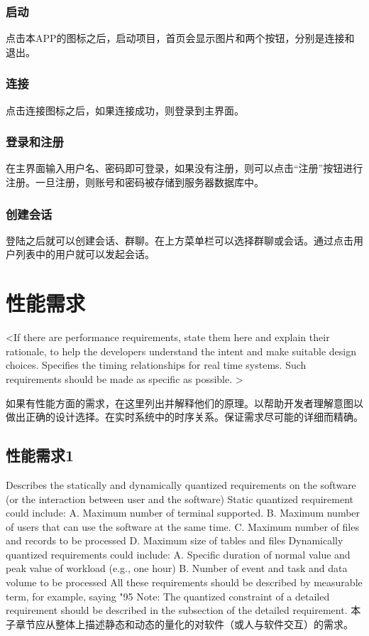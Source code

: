 \subsubsection{启动}
  点击本APP的图标之后，启动项目，首页会显示图片和两个按钮，分别是连接和退出。
\subsubsection{连接}
  点击连接图标之后，如果连接成功，则登录到主界面。
\subsubsection{登录和注册}
  在主界面输入用户名、密码即可登录，如果没有注册，则可以点击“注册”按钮进行注册。一旦注册，则账号和密码被存储到服务器数据库中。
\subsubsection{创建会话}
  登陆之后就可以创建会话、群聊。在上方菜单栏可以选择群聊或会话。通过点击用户列表中的用户就可以发起会话。

\section{性能需求}
\iffalse
<If there are performance requirements, state them here and explain their rationale, to help the developers understand the intent and make suitable design choices. Specifies the timing relationships for real time systems. Such requirements should be made as specific as possible. >

如果有性能方面的需求，在这里列出并解释他们的原理。以帮助开发者理解意图以做出正确的设计选择。在实时系统中的时序关系。保证需求尽可能的详细而精确。

\subsection{性能需求1}
Describes the statically and dynamically quantized requirements on the software (or the interaction between user and the software)
Static quantized requirement could include:
A. Maximum number of terminal supported.
B. Maximum number of users that can use the software at the same time.
C. Maximum number of files and records to be processed
D. Maximum size of  tables and files
Dynamically quantized requirements could include:
A. Specific duration of normal value and peak value of workload (e.g., one hour)
B. Number of event and task and data volume to be processed 
All these requirements should be described by measurable term, for example, saying "95%
Note: The quantized constraint of a detailed requirement should be described in the subsection of the detailed requirement.
本子章节应从整体上描述静态和动态的量化的对软件（或人与软件交互）的需求。


